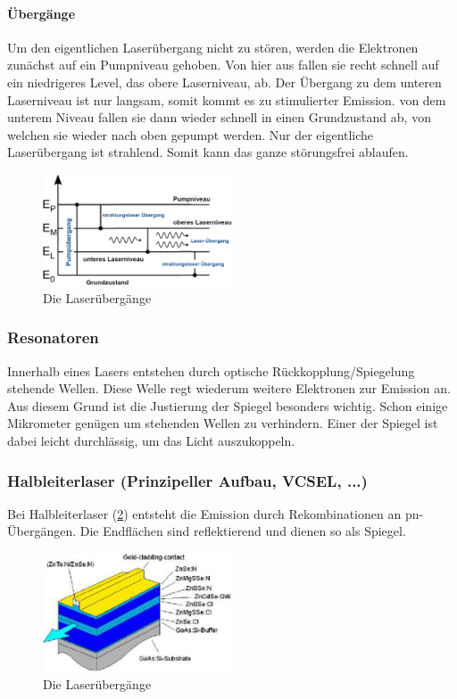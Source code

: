 	\paragraph{Übergänge}
	Um den eigentlichen Laserübergang nicht zu stören, werden die Elektronen zunächst auf ein Pumpniveau gehoben. Von hier aus fallen sie recht schnell auf ein niedrigeres Level, das obere Laserniveau, ab. Der Übergang zu dem unteren Laserniveau ist nur langsam, somit kommt es zu stimulierter Emission. von dem unterem Niveau fallen sie dann wieder schnell in einen Grundzustand ab, von welchen sie wieder nach oben gepumpt werden. Nur der eigentliche Laserübergang ist strahlend. Somit kann das ganze störungsfrei ablaufen.
	\begin{figure}[h]
		\centering
		\includegraphics[width=0.5\textwidth]{Kapitel/Kap11/uebergang.png}
		\caption{Die Laserübergänge}
		\label{11_uebergang}
	\end{figure}
	\subsubsection{Resonatoren}
	Innerhalb eines Lasers entstehen durch optische Rückkopplung/Spiegelung stehende Wellen. Diese Welle regt wiederum weitere Elektronen zur Emission an. Aus diesem Grund ist die Justierung der Spiegel besonders wichtig. Schon einige Mikrometer genügen um stehenden Wellen zu verhindern. Einer der Spiegel ist dabei leicht durchlässig, um das Licht auszukoppeln.
	\subsubsection{Halbleiterlaser (Prinzipeller Aufbau, VCSEL, ...)}
	Bei Halbleiterlaser (\ref{11_kantenlaser}) entsteht die Emission durch Rekombinationen an pn-Übergängen. Die Endflächen sind reflektierend und dienen so als Spiegel.
	\begin{figure}
		\centering
		\includegraphics[width=0.5\textwidth]{Kapitel/Kap11/kantenlaser.png}
		\caption{Die Laserübergänge}
		\label{11_kantenlaser}
	\end{figure}
